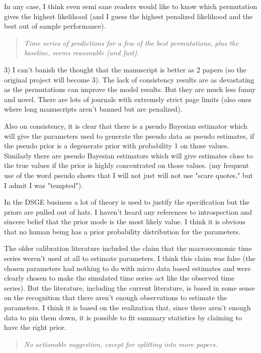 \documentclass{article}
\begin{document}
In any case, I think even semi sane readers would like to know which permutation gives the highest likelihood (and I guess the highest penalized likelihood and the best out of sample performance).

\begin{quotation} {\em Time series of predictions for a few of the best
    permutations, plus the baseline, seems reasonable (and fast).}
\end{quotation}

3) I can't banish the thought that the manuscript is better as 2 papers (so the original project will become 3).  The lack of consistency results are as devastating as the permutations can improve the model results.  But they are much less funny and novel.  There are lots of journals with extremely strict page limits (also ones where long manuscripts aren't banned but are penalized).  

Also on consistency, it is clear that there is a pseudo Bayesian estimator which will give the parameters used to generate the pseudo data as pseudo estimates, if the pseudo prior is a degenerate prior with probability 1 on those values.  Similarly there are pseudo Bayesian estimators which will give estimates close to the true values if the prior is highly concentrated on those values. (my frequent use of the word pseudo shows that I will not just will not use "scare quotes," but I admit I was "tempted").

In the DSGE business a lot of theory is used to justify the specification but the priors are pulled out of hats.  I haven't heard any references to introspection and sincere belief that the prior mode is the most likely value.  I think it is obvious that no human being has a prior probability distribution for the parameters.

The older calibration literature included the claim that the macroeconomic time series weren't used at all to estimate parameters.  I think this claim was false (the chosen parameters had nothing to do with micro data based estimates and were clearly chosen to make the simulated time series act like the observed time series).  But the literature, including the current literature, is based in some sense on the recognition that there aren't enough observations to estimate the parameters.  I think it is based on the realization that, since there aren't enough data to pin them down, it is possible to fit summary statistics by claiming to have the right prior.

\begin{quotation} {\em No actionable suggestion, except for splitting into more papers.}
\end{quotation}
\end{document}
